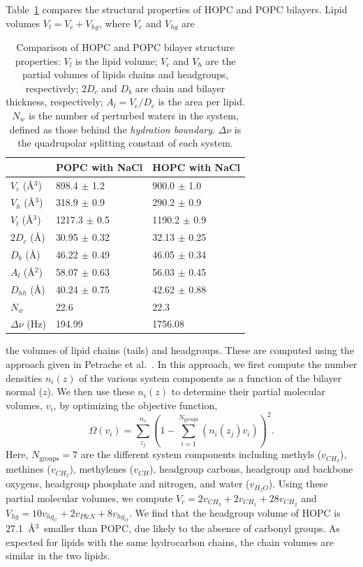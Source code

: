 \documentclass[12pt,openany,final]{book}
\begin{document}
Table~\ref{tab:struc} compares the structural properties of HOPC and POPC bilayers. 
Lipid volumes $V_l = V_c + V_{hg}$, where $V_c$ and $V_{hg}$ are 
\begin{table}
    \caption[Comparison of HOPC and POPC bilayer structure properties.]{ 
Comparison of HOPC and POPC bilayer structure properties: $V_l$ is the lipid
volume; $V_c$ and $V_h$ are the partial volumes of lipids chains and headgroups,
respectively; $2D_c$ and $D_b$ are chain and bilayer thickness, respectively; $A_l=V_c/D_c$ is the area per lipid.
$N_{w}$ is the number of perturbed waters in the system, defined as those behind the \emph{hydration boundary}. $\Delta \nu$ is the quadrupolar splitting constant of each system.}
\label{tab:struc}
\begin{tabularx}{\textwidth}{X|X|X}%
& POPC with NaCl & HOPC with NaCl \\ \hline
$V_c$ (\AA$^3$) & 898.4 $\pm$ 1.2 & 900.0 $\pm$ 1.0   \\
$V_h$ (\AA$^3$) & 318.9 $\pm$ 0.9 & 290.2 $\pm$ 0.9   \\
$V_l$ (\AA$^3$) & 1217.3 $\pm$ 0.5 & 1190.2 $\pm$ 0.9   \\
$2D_c$ (\AA) & 30.95 $\pm$ 0.32 & 32.13 $\pm$ 0.25   \\
$D_b$ (\AA) & 46.22 $\pm$ 0.49 & 46.05 $\pm$ 0.34   \\
$A_l$ (\AA$^2$) & 58.07 $\pm$ 0.63 & 56.03 $\pm$ 0.45   \\
$D_{hh}$ (\AA) & 40.24 $\pm$ 0.75 & 42.62 $\pm$ 0.88   \\
$N_{w}$ & 22.6 & 22.3  \\ 
$\Delta \nu$ (Hz) & 194.99 & 1756.08 \\
\end{tabularx}
\end{table}
the volumes of lipid chains (tails) and headgroups. 
These are computed using the approach given in 
Petrache et al.~\cite{petrache:1997}. In this approach, 
we first compute the number densities $n_i(z)$ of the various system 
components as a function of the bilayer normal ($z$). We then use these 
$n_i(z)$ to determine their partial molecular volumes, $v_i$, by optimizing the objective function, 
\begin{equation}
\label{eq:petrache}
\Omega(v_i)=\sum^{n_s}_{z_j}(1-\sum_{i=1}^{N_{\text{groups}}}(n_i(z_j)v_i))^2.
\end{equation}
Here, $N_{\text{groups}}=7$ are the different system 
components including methyls ($v_{CH_3}$), methines ($v_{CH_2}$), 
methylenes ($v_{CH}$), headgroup carbons, headgroup and backbone oxygens, headgroup phosphate
and nitrogen, and water ($v_{H_2O}$). 
Using these partial molecular volumes, we compute 
$V_c = 2v_{CH_3} + 2v_{CH_1} + 28v_{CH_2}$ and $V_{hg} = 10v_{hg_C} + 2v_{P\text{\&}N} + 8v_{hg_O}$. 
We find that the headgroup volume of HOPC is 
27.1~\AA$^3$~smaller than POPC, due likely to the absence of carbonyl groups. 
As expected for lipids with the same
hydrocarbon chains, the chain volumes are similar in the two lipids.
\end{document}
